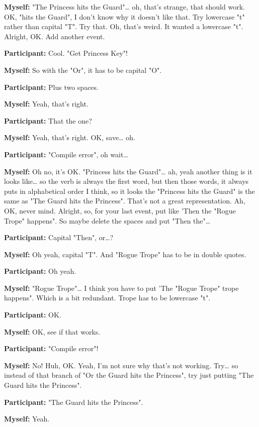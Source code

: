 \documentclass[11pt]{report}
\begin{document}
\begin{linenumbers}
\textbf{Myself:} "The Princess hits the Guard"\ldots{} oh, that's strange, that should work. OK, "hits the Guard", I don't know why it doesn't like that. Try lowercase "t" rather than capital "T". Try that. Oh, that's weird. It wanted a lowercase "t". Alright, OK. Add another event.

\textbf{Participant:} Cool. "Get Princess Key"!

\textbf{Myself:} So with the "Or", it has to be capital "O".

\textbf{Participant:} Plus two spaces.

\textbf{Myself:} Yeah, that's right.

\textbf{Participant:} That the one?

\textbf{Myself:} Yeah, that's right. OK, save\ldots{} oh.

\textbf{Participant:} "Compile error", oh wait\ldots{}

\textbf{Myself:} Oh no, it's OK. "Princess hits the Guard"\ldots{} ah, yeah another thing is it looks like\ldots{} so the verb is always the first word, but then those words, it always puts in alphabetical order I think, so it looks the "Princess hits the Guard" is the same as "The Guard hits the Princess". That's not a great representation. Ah, OK, never mind. Alright, so, for your last event, put like 'Then the "Rogue Trope" happens". So maybe delete the spaces and put "Then the"\ldots{}

\textbf{Participant:} Capital "Then", or\ldots{}?

\textbf{Myself:} Oh yeah, capital "T". And "Rogue Trope" has to be in double quotes.

\textbf{Participant:} Oh yeah.

\textbf{Myself:} "Rogue Trope"\ldots{} I think you have to put 'The "Rogue Trope" trope happens". Which is a bit redundant. Trope has to be lowercase "t".

\textbf{Participant:} OK.

\textbf{Myself:} OK, see if that works.

\textbf{Participant:} "Compile error"!

\textbf{Myself:} No! Huh, OK. Yeah, I'm not sure why that's not working. Try\ldots{} so instead of that branch of "Or the Guard hits the Princess", try just putting "The Guard hits the Princess".

\textbf{Participant:} "The Guard hits the Princess".

\textbf{Myself:} Yeah.


\end{linenumbers}
\end{document}
